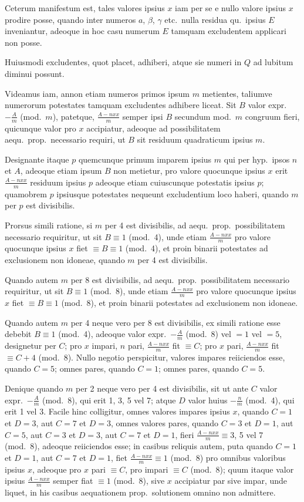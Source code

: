 \documentclass[12pt,a4paper]{article}
\theoremstyle{plain}
\theoremstyle{definition}
\theoremstyle{remark}
\begin{document}
Ceterum manifestum est, tales valores ipsius $x$ iam per se e nullo valore
ipsius $x$ prodire posse, quando inter numeros $a$, $\beta$, $\gamma$ etc.\ nulla residua qu.\ ipsius $E$ inveniantur, adeoque in hoc casu numerum $E$ tamquam excludentem
applicari non posse.

Huiusmodi excludentes, quot placet, adhiberi, atque sie numeri in $Q$ ad
lubitum diminui possunt.

Videamus iam, annon etiam numeros primos ipsum $m$ metientes, taliumve
numerorum potestates tamquam excludentes adhibere liceat. Sit $B$ valor
expr.\ $-\frac{A}{m}$ (mod.\ $m$), patetque, $\frac{A-nxx}{m}$ semper ipsi $B$ secundum
mod.\ $m$ congruum fieri, quicunque valor pro $x$ accipiatur, adeoque ad
possibilitatem aequ.\ prop.\ necessario requiri, ut $B$ sit residuum
quadraticum ipsius $m$.

Designante itaque $p$ quemcunque primum imparem ipsius $m$ qui per hyp.\ ipsos $n$ et $A$, adeoque etiam ipsum $B$ non metietur, pro valore quocunque
ipsius $x$ erit $\frac{A-nxx}{m}$ residuum ipsius $p$ adeoque etiam cuiuscunque
potestatis ipsius $p$; quamobrem $p$ ipsiusque potestates nequeunt
excludentium loco haberi, quando $m$ per $p$ est divisibilis.

Prorsus simili ratione, si $m$ per 4 est divisibilis, ad aequ.\ prop.\ possibilitatem necessario requiritur, ut sit $B\equiv 1$ (mod.\ 4), unde etiam
$\frac{A-nxx}{m}$ pro valore quocunque ipsius $x$ fiet $\equiv B\equiv 1$ (mod.\ 4), et proin
binarii potestates ad exclusionem non idoneae, quando $m$ per 4 est divisibilis.

Quando autem $m$ per 8 est divisibilis, ad aequ.\ prop.\ possibilitatem
necessario requiritur, ut sit $B\equiv 1$ (mod.\ 8), unde etiam
$\frac{A-nxx}{m}$ pro valore quocunque ipsius $x$ fiet $\equiv B\equiv 1$ (mod.\ 8), et
proin binarii potestates ad exclusionem non idoneae.

Quando autem $m$ per 4 neque vero per 8 est divisibilis, ex simili ratione
esse debebit $B\equiv 1$ (mod.\ 4), adeoque valor expr.\ $-\frac{A}{m}$ (mod.\ 8) vel $=1$
vel $=5$, designetur per $C$; pro $x$ impari, $n$ pari, $\frac{A-nxx}{m}$ fit $\equiv C$;
pro $x$ pari, $\frac{A-nxx}{m}$ fit $\equiv C+4$ (mod.\ 8). Nullo negotio perspicitur,
valores impares reiiciendos esse, quando $C=5$; omnes pares, quando $C=1$;
omnes pares, quando $C=5$.

Denique quando $m$ per 2 neque vero per 4 est divisibilis, sit ut ante $C$
valor expr.\ $-\frac{A}{m}$ (mod.\ 8), qui erit 1, 3, 5 vel 7; atque $D$ valor huius
$-\frac{n}{m}$ (mod.\ 4), qui erit 1 vel 3. Facile hinc colligitur, omnes valores impares
ipsius $x$, quando $C=1$ et $D=3$, aut $C=7$ et $D=3$, omnes valores pares,
quando $C=3$ et $D=1$, aut $C=5$, aut $C=3$ et $D=3$, aut $C=7$ et $D=1$,
fieri $\frac{A-nxx}{m}\equiv 3$, 5 vel 7 (mod.\ 8), adeoque reiiciendos esse; in casibus
reliquis autem, puta quando $C=1$ et $D=1$, aut $C=7$ et $D=1$, fiet
$\frac{A-nxx}{m}\equiv 1$ (mod.\ 8) pro omnibus valoribus ipsius $x$, adeoque pro $x$
pari $\equiv C$, pro impari $\equiv C$ (mod.\ 8); quum itaque valor ipsius
$\frac{A-nxx}{m}$ semper fiat $\equiv 1$ (mod.\ 8), sive $x$ accipiatur par sive impar,
unde liquet, in his casibus aequationem prop.\ solutionem omnino non admittere.
\end{document}
